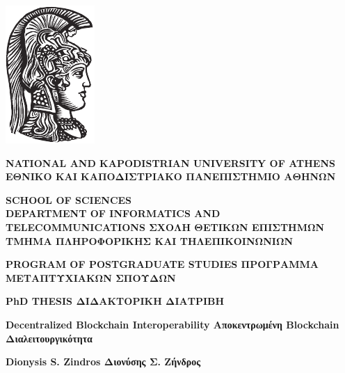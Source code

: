 \ifuniversity
  \begin{center}
  \includegraphics{chapters/preface/figures/athena-black}
  \end{center}
  \begin{minipage}[t]{\textwidth}
      \begin{center}
        {\large \bfseries
        \ifenglishfrontpage
          NATIONAL AND KAPODISTRIAN UNIVERSITY OF ATHENS
        \else
          ΕΘΝΙΚΟ ΚΑΙ ΚΑΠΟΔΙΣΤΡΙΑΚΟ ΠΑΝΕΠΙΣΤΗΜΙΟ ΑΘΗΝΩΝ
        \fi
        }
        \linebreak

        {\bfseries
        \ifenglishfrontpage
          SCHOOL OF SCIENCES \\ DEPARTMENT OF INFORMATICS AND TELECOMMUNICATIONS
        \else
          ΣΧΟΛΗ ΘΕΤΙΚΩΝ ΕΠΙΣΤΗΜΩΝ \\ ΤΜΗΜΑ  ΠΛΗΡΟΦΟΡΙΚΗΣ ΚΑΙ ΤΗΛΕΠΙΚΟΙΝΩΝΙΩΝ
        \fi
        }
        \linebreak

        {\bfseries
        \ifenglishfrontpage
          PROGRAM OF POSTGRADUATE STUDIES
        \else
          ΠΡΟΓΡΑΜΜΑ  ΜΕΤΑΠΤΥΧΙΑΚΩΝ ΣΠΟΥΔΩΝ
        \fi}
        \linebreak\linebreak\linebreak
        \linebreak\linebreak\linebreak

        {\bfseries
        \ifenglishfrontpage
          PhD THESIS
        \else
          ΔΙΔΑΚΤΟΡΙΚΗ ΔΙΑΤΡΙΒΗ
        \fi}
        \linebreak\linebreak\linebreak

        {\Large \bfseries
        \ifenglishfrontpage
          Decentralized Blockchain Interoperability
        \else
          Αποκεντρωμένη Blockchain Διαλειτουργικότητα
        \fi}
        \linebreak\linebreak\linebreak

        {\bfseries
        \ifenglishfrontpage
        Dionysis S. Zindros
      \else
        Διονύσης Σ. Ζήνδρος
      \fi}
      \end{center}
  \end{minipage}
